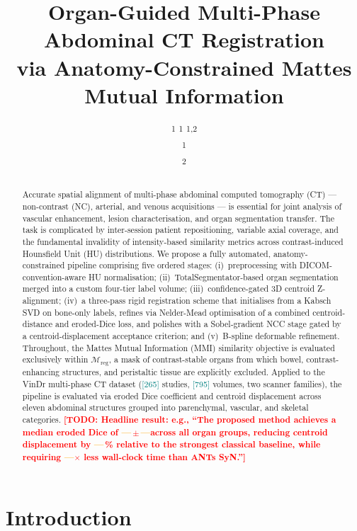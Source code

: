 \documentclass[10pt,twocolumn]{article}
\title{%
  Organ-Guided Multi-Phase Abdominal CT Registration\\
  via Anatomy-Constrained Mattes Mutual Information
}
\author{%
  \TODO{Author 1}\textsuperscript{1} \quad
  \TODO{Author 2}\textsuperscript{1} \quad
  \TODO{Author 3}\textsuperscript{1,2}\\[4pt]
  \textsuperscript{1}\TODO{Institution}\\
  \textsuperscript{2}\TODO{Institution (if applicable)}\\[4pt]
  \texttt{\TODO{corresponding@email.edu}}
}
\date{}
\newcommand{\TODO}[1]{\textcolor{red}{\textbf{[TODO: #1]}}}
\newcommand{\NUM}[1]{\textcolor{teal}{[#1]}}
\newcommand{\BLANK}{\textcolor{orange}{\textbf{---}}}   %
\newcommand{\Mreg}{\mathcal{M}_{\text{reg}}}
\begin{document}
\maketitle

\begin{abstract}
Accurate spatial alignment of multi-phase abdominal computed tomography
(CT) — non-contrast (NC), arterial, and venous acquisitions — is
essential for joint analysis of vascular enhancement, lesion
characterisation, and organ segmentation transfer.
The task is complicated by inter-session patient repositioning, variable
axial coverage, and the fundamental invalidity of intensity-based
similarity metrics across contrast-induced Hounsfield Unit (HU)
distributions.
We propose a fully automated, anatomy-constrained pipeline comprising
five ordered stages: (i)~preprocessing with DICOM-convention-aware
HU normalisation; (ii)~TotalSegmentator-based organ segmentation merged
into a custom four-tier label volume; (iii)~confidence-gated 3D centroid
Z-alignment; (iv)~a three-pass rigid registration scheme that initialises
from a Kabsch SVD on bone-only labels, refines via Nelder-Mead
optimisation of a combined centroid-distance and eroded-Dice loss, and
polishes with a Sobel-gradient NCC stage gated by a centroid-displacement
acceptance criterion; and (v)~B-spline deformable refinement.
Throughout, the Mattes Mutual Information (MMI) similarity objective is
evaluated exclusively within $\Mreg$, a mask of contrast-stable organs
from which bowel, contrast-enhancing structures, and peristaltic tissue
are explicitly excluded.
Applied to the VinDr multi-phase CT dataset
(\NUM{265} studies, \NUM{795} volumes, two scanner families), the
pipeline is evaluated via eroded Dice coefficient and centroid
displacement across eleven abdominal structures grouped into parenchymal,
vascular, and skeletal categories.
\TODO{Headline result: e.g., ``The proposed method achieves a median
eroded Dice of \BLANK\,$\pm$\,\BLANK across all organ groups, reducing
centroid displacement by \BLANK\,\% relative to the strongest classical
baseline, while requiring \BLANK$\times$ less wall-clock time than ANTs
SyN.''}
\end{abstract}

\section{Introduction}
\label{sec:intro}
\end{document}
